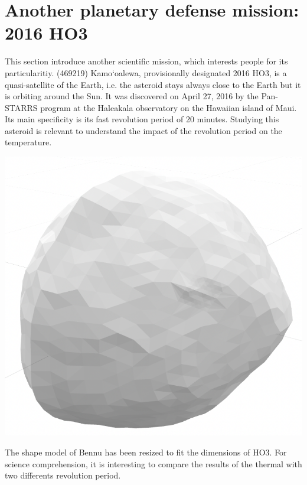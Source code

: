\section{Another planetary defense mission: 2016 HO3}
\label{sec:7}

This section introduce another scientific mission, which interests people for its particularitiy. (469219) Kamo‘oalewa, provisionally designated 2016 HO3, is a quasi-satellite of the Earth, i.e. the asteroid stays always close to the Earth but it is orbiting around the Sun. It was discovered on April 27, 2016 by the Pan-STARRS program at the Haleakala observatory on the Hawaiian island of Maui. Its main specificity is its fast revolution period of 20 minutes. Studying this asteroid is relevant to understand the impact of the revolution period on the temperature.

\begin{center}
    \includegraphics[width=0.5\linewidth]{rsc/HO3_shapemodel.png}
    \label{fig:7.1}
\end{center}

The shape model of Bennu has been resized to fit the dimensions of HO3. For science comprehension, it is interesting to compare the results of the thermal with two differents revolution period. 

